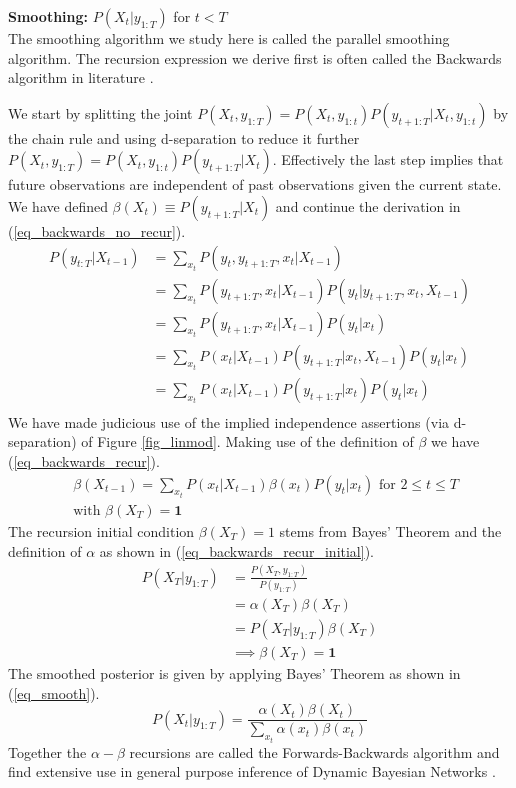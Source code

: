 \documentclass[../masters.tex]{subfiles}
\begin{document}
\textbf{Smoothing:} $P(X_t|y_{1:T})$ for $t<T$\\
The smoothing algorithm we study here is called the parallel smoothing algorithm. The recursion expression we derive first is often called the Backwards algorithm in literature \cite{murphy1}.

We start by splitting the joint $P(X_t, y_{1:T}) = P(X_t, y_{1:t})P(y_{t+1:T}|X_t,y_{1:t})$ by the chain rule and using d-separation to reduce it further $P(X_t, y_{1:T}) = P(X_t, y_{1:t})P(y_{t+1:T}|X_t)$. Effectively the last step implies that future observations are independent of past observations given the current state. We have defined $\beta(X_t)\equiv P(y_{t+1:T}|X_t)$ and continue the derivation in (\ref{eq_backwards_no_recur}).
\begin{equation}
\begin{aligned}
P(y_{t:T}|X_{t-1}) &= \sum_{x_t} P(y_t, y_{t+1:T}, x_t|X_{t-1}) \\
&= \sum_{x_t} P(y_{t+1:T}, x_t | X_{t-1})P(y_t| y_{t+1:T}, x_t, X_{t-1}) \\
&= \sum_{x_t} P(y_{t+1:T}, x_t | X_{t-1})P(y_t| x_t) \\
&= \sum_{x_t} P(x_t | X_{t-1})P(y_{t+1:T}| x_t,X_{t-1})P(y_t| x_t) \\
&= \sum_{x_t} P(x_t | X_{t-1})P(y_{t+1:T}| x_t)P(y_t| x_t) \\
\end{aligned}
\label{eq_backwards_no_recur}
\end{equation}
We have made judicious use of the implied independence assertions (via d-separation) of Figure \ref{fig_linmod}. Making use of the definition of $\beta$ we have (\ref{eq_backwards_recur}).
\begin{equation}
\begin{aligned}
&\beta(X_{t-1}) = \sum_{x_t} P(x_t | X_{t-1})\beta(x_t)P(y_t| x_t) \text{ for } 2 \leq t \leq T \\
&\text{with } \beta(X_T) = \mathbf{1}
\end{aligned}
\label{eq_backwards_recur}
\end{equation}
The recursion initial condition $\beta(X_T) = 1$ stems from Bayes' Theorem and the definition of $\alpha$ as shown in (\ref{eq_backwards_recur_initial}).
\begin{equation}
\begin{aligned}
P(X_T|y_{1:T}) &= \frac{P(X_T, y_{1:T})}{P(y_{1:T})} \\
&= \alpha(X_T) \beta(X_T)\\
&= P(X_T| y_{1:T}) \beta(X_T)\\
&\implies \beta(X_T) = \mathbf{1}
\end{aligned}
\label{eq_backwards_recur_initial}
\end{equation}
The smoothed posterior is given by applying Bayes' Theorem as shown in (\ref{eq_smooth}).
\begin{equation}
P(X_t|y_{1:T}) = \frac{\alpha(X_t)\beta(X_t)}{\sum_{x_t}\alpha(x_t)\beta(x_t)}
\label{eq_smooth}
\end{equation}
Together the $\alpha - \beta$ recursions are called the Forwards-Backwards algorithm and find extensive use in general purpose inference of Dynamic Bayesian Networks \cite{murphy1}.
\end{document}
